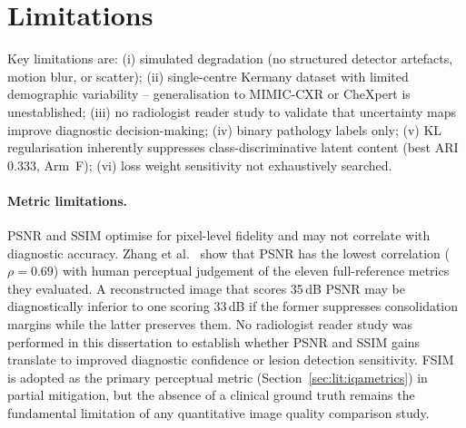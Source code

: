 \documentclass[12pt, a4paper, twoside, openright]{book}
\begin{document}
\section{Limitations}
\label{sec:disc:limitations}

Key limitations are: (i) simulated degradation (no structured detector artefacts, motion blur, or scatter); (ii) single-centre Kermany dataset with limited demographic variability -- generalisation to MIMIC-CXR or CheXpert is unestablished; (iii) no radiologist reader study to validate that uncertainty maps improve diagnostic decision-making; (iv) binary pathology labels only; (v) KL regularisation inherently suppresses class-discriminative latent content (best ARI~$0.333$, Arm~F); (vi) loss weight sensitivity not exhaustively searched.

\paragraph{Metric limitations.} PSNR and SSIM optimise for pixel-level fidelity and may not correlate with diagnostic accuracy. Zhang et al.\ \cite{zhang_comprehensive_2012} show that PSNR has the lowest correlation ($\rho=0.69$) with human perceptual judgement of the eleven full-reference metrics they evaluated. A reconstructed image that scores 35\,dB PSNR may be diagnostically inferior to one scoring 33\,dB if the former suppresses consolidation margins while the latter preserves them. No radiologist reader study was performed in this dissertation to establish whether PSNR and SSIM gains translate to improved diagnostic confidence or lesion detection sensitivity. FSIM is adopted as the primary perceptual metric (Section~\ref{sec:lit:iqametrics}) in partial mitigation, but the absence of a clinical ground truth remains the fundamental limitation of any quantitative image quality comparison study.
\end{document}
